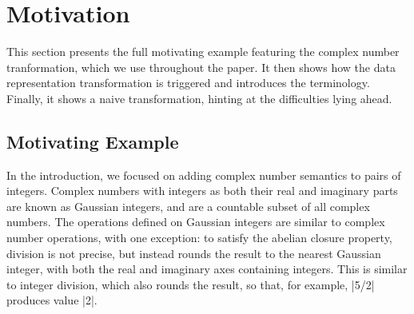 \section{Motivation}
\label{sec:problem}

This section presents the full motivating example featuring the complex number tranformation, which we use throughout the paper. It then shows how the data representation transformation is triggered and introduces the terminology. Finally, it shows a naive transformation, hinting at the difficulties lying ahead.

\subsection{Motivating Example}

In the introduction, we focused on adding complex number semantics to
pairs of integers. Complex numbers with integers as both their real
and imaginary parts are known as Gaussian integers, and are a
countable subset of all complex numbers. The operations defined on
Gaussian integers are similar to complex number operations, with one
exception: to satisfy the abelian closure property, division is not precise,
but instead rounds the result to the nearest Gaussian integer, with both the real and imaginary
axes containing integers. This is similar to integer division, which
also rounds the result, so that, for example, |5/2| produces value
|2|.


